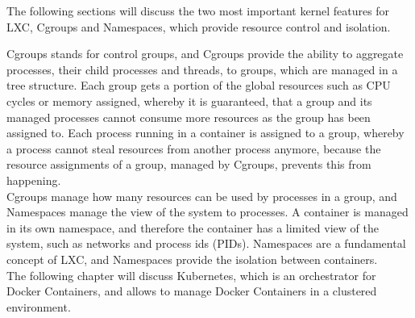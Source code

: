 The following sections will discuss the two most important kernel features for LXC, Cgroups and Namespaces, which provide resource control and isolation. 

Cgroups stands for control groups, and Cgroups provide the ability to aggregate processes, their child processes and threads, to groups, which are managed in a tree structure. Each group gets a portion of the global resources such as CPU cycles or memory assigned, whereby it is guaranteed, that a group and its managed processes cannot consume more resources as the group has been assigned to. Each process running in a container is assigned to a group, whereby a process cannot steal resources from another process anymore, because the resource assignments of a group, managed by Cgroups, prevents this from happening\cite{KernelCGroupsV12018, KernelCGroupV22015, IntelLXCHyperVisor2014}. \\

Cgroups manage how many resources can be used by processes in a group, and Namespaces manage the view of the system to processes. A container is managed in its own namespace, and therefore the container has a limited view of the system, such as networks and process ids (PIDs). Namespaces are a fundamental concept of LXC, and Namespaces provide the isolation between containers\cite{LinuxNamespaces2018, IntelLXCHyperVisor2014}. \\

The following chapter will discuss Kubernetes, which is an orchestrator for Docker Containers, and allows to manage Docker Containers in a clustered environment. 
 

